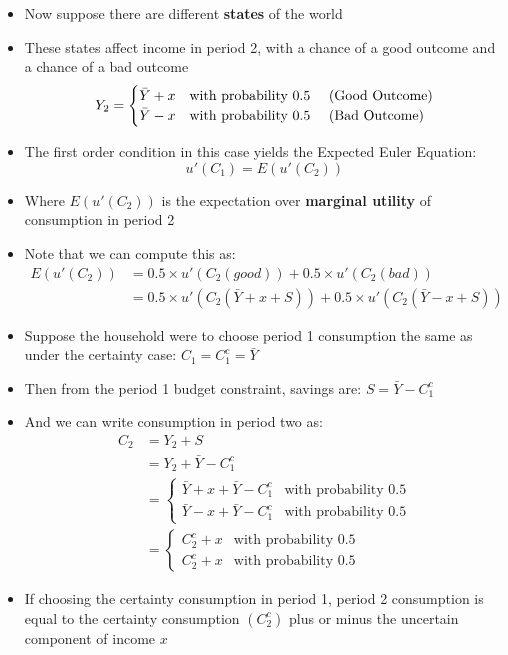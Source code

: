 \documentclass[a4paper,twoside]{article}
\numberwithin{equation}{section}
\numberwithin{figure}{section}
\begin{document}
	\begin{itemize}
		\item Now suppose there are different \textbf{states} of the world
		\item These states affect income in period 2, with a chance of a good outcome and a chance of a bad outcome
		\[	
			Y_2= 
			\begin{cases}
				\bar{Y} + x & \text{with probability 0.5 \quad (Good Outcome)} \\
				\bar{Y} - x & \text{with probability 0.5 \quad (Bad Outcome)}
			\end{cases}
		\]
		\item The first order condition in this case yields the \textcolor{myblue}{Expected Euler Equation:}
		\[
			u'(C_1) = E(u'(C_2))
		\]
		\item Where \( E(u'(C_2)) \) is the expectation over \textbf{marginal utility} of consumption in period 2
		\item Note that we can compute this as:
		\begin{align*}
			E(u'(C_2)) &= 0.5 \times u'(C_2(good)) + 0.5 \times u'(C_2(bad)) \\
			&= 0.5 \times u'(C_2(\bar{Y} + x + S)) + 0.5 \times u'(C_2(\bar{Y} - x + S))
		\end{align*}
		\item Suppose the household were to choose period 1 consumption the same as under the certainty case: \( C_1 = C_1^c = \bar{Y} \)
		\item Then from the period 1 budget constraint, savings are: \( S = \bar{Y} - C_1^c \)
		\item And we can write consumption in period two as:
		\begin{align*}
			C_2 &= Y_2 + S \\
			&= Y_2 + \bar{Y} - C_1^c \\
			&=
			\begin{cases}
				\bar{Y} + x + \bar{Y} - C_1^c & \text{with probability 0.5} \\
				\bar{Y} - x + \bar{Y} - C_1^c & \text{with probability 0.5}
			\end{cases}
			\\
			&=
			\begin{cases}
				C_2^c + x & \text{with probability 0.5} \\
				C_2^c + x & \text{with probability 0.5}
			\end{cases}
		\end{align*}
		\item If choosing the certainty consumption in period 1, period 2 consumption is equal to the certainty consumption \( (C_2^c) \) plus or minus the uncertain component of income \( x \)

\end{itemize}
\end{document}
